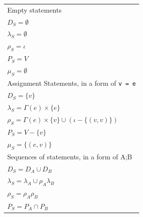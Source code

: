 \documentclass[oneside,12pt,a4paper]{book}
\begin{document}
\begin{table}[t]
  \centering
  	\begin{tabular}{l}
Empty statements                                                                            \\
$D_S = \emptyset$                                                                           \\
$\lambda_S = \emptyset$                                                                     \\
$\rho_S = \iota$                                                                            \\
$P_S = V$                                                                                   \\
$\mu_S = \emptyset$                                                                         \\
\hline                                                                                      
Assignment Statements, in a form of \texttt{v = e}                                          \\
$D_S = \{v\}$                                                                               \\
$\lambda_S = \Gamma(e) \times \{e\}$                                                        \\
$\rho_S = \Gamma(e) \times \{v\} \cup (\iota - \{(v,v)\})$                                   \\
$P_S = V - \{v\}$                                                                           \\
$\mu_S = \{(e,v)\}$                                                                         \\
\hline                                                                                      
Sequences of statements, in a form of A;B                                                   \\
$D_S = D_A \cup D_B$                                                                        \\
$\lambda_S = \lambda_A \cup \rho_A\lambda_B$                                                \\
$\rho_S = \rho_A\rho_B$                                                                     \\
$P_S = P_A \cap P_B$                                                                        \\

\end{tabular}
\end{table}
\end{document}

